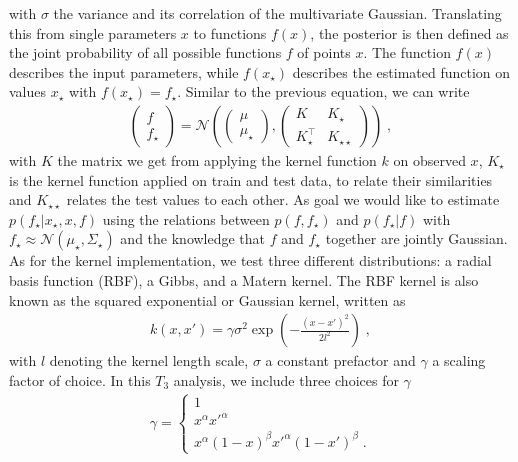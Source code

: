 \documentclass[11pt,a4paper]{article}
\begin{document}
%
with $\sigma$ the variance and its correlation of the multivariate Gaussian.
Translating this from single parameters $x$ to functions $f(x)$, the posterior is then defined as the joint probability of all possible functions $f$ of points $x$. The function $f(x)$ describes the input parameters, while $f(x_\star)$ describes the estimated function on values $x_\star$ with $f(x_\star)=f_\star$. Similar to the previous equation, we can write
%
\begin{align}
    \begin{pmatrix}%
    f \\ f_\star
    \end{pmatrix}
    = \mathcal{N} \left(
    \begin{pmatrix}
    \mu \\ \mu_\star
    \end{pmatrix}
    ,
    \begin{pmatrix}
    K & K_\star\\ K_\star^\top & K_{\star\star}
    \end{pmatrix}
    \right) \;,
\end{align}
%
with $K$ the matrix we get from applying the kernel function $k$ on observed $x$, $K_\star$ is the kernel function applied on train and test data, to relate their similarities and $K_{\star\star}$ relates the test values to each other.
As goal we would like to estimate $p(f_\star | x_\star, x, f)$ using the relations between $p(f, f_\star)$ and $p(f_\star|f)$ with $f_\star \approx \mathcal{N}(\mu_\star, \Sigma_\star)$ and the knowledge that $f$ and $f_\star$ together are jointly Gaussian.
As for the kernel implementation, we test three different distributions: a radial basis function (RBF), a Gibbs, and a Matern kernel. 
The RBF kernel is also known as the squared exponential or Gaussian kernel, written as
%
\begin{align}
    k(x,x') = \gamma \sigma^2 \exp\left(- \frac{(x-x')^2}{2l^2} \right)\; ,
    \label{eq:RBF}
\end{align}
%
with $l$ denoting the kernel length scale, $\sigma$ a constant prefactor and $\gamma$ a scaling factor of choice. In this $T_3$ analysis, we include three choices for $\gamma$
\begin{align}
    \gamma =    \begin{cases}
                    1 \\
                    x^\alpha x'^\alpha \\
                    x^\alpha (1-x)^\beta x'^\alpha (1-x')^\beta \; .
                \end{cases}
    \label{eq:GP_scale}
\end{align}
\end{document}
